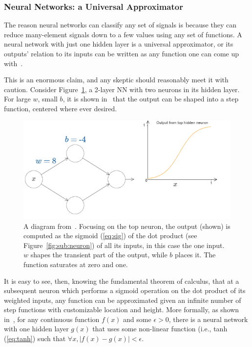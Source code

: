 \subsubsection{Neural Networks: a Universal Approximator}
The reason neural networks can classify any set of signals is because they can reduce many-element signals down to a few values using any set of functions. A neural network with just one hidden layer is a universal approximator, or its outputs' relation to its inputs can be written as any function one can come up with~\cite{uniapproxim}.

This is an enormous claim, and any skeptic should reasonably meet it with caution. Consider Figure~\ref{fig:simpleapprox}, a 2-layer NN with two neurons in its hidden layer. For large $w$, small $b$, it is shown in~\cite{universalapproxarticle} that the output can be shaped into a step function, centered where ever desired.

\begin{figure}[ht!]
	\centering	\includegraphics[width=1\textwidth,keepaspectratio]{figs/simpleapprox.png}
    \caption{A diagram from~\cite{universalapproxarticle}. Focusing on the top neuron, the output (shown) is computed as the sigmoid (\ref{eq:sig}) of the dot product (see Figure~\ref{fig:sub:neuron}) of all its inputs, in this case the one input. $w$ shapes the transient part of the output, while $b$ places it. The function saturates at zero and one.}
\label{fig:simpleapprox}      
\end{figure}

It is easy to see, then, knowing the fundamental theorem of calculus, that at a subsequent neuron which performs a sigmoid operation on the dot product of its weighted inputs, any function can be approximated given an infinite number of step functions with customizable location and height. More formally, as shown in~\cite{uniapproxim}, for any continuous function $f(x)$ and some $\epsilon > 0$, there is a neural network with one hidden layer $g(x)$ that uses some non-linear function (i.e., tanh (\ref{eq:tanh}) such that $\forall x, \mid f(x) - g(x) \mid < \epsilon$.

